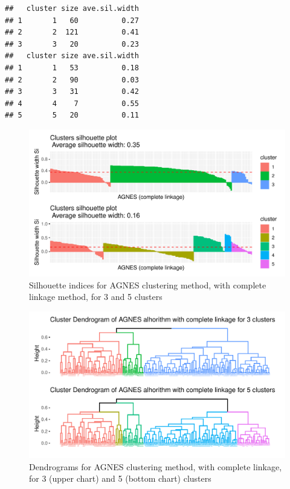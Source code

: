 \documentclass[11pt,a4paper]{article}\usepackage[]{graphicx}\usepackage[]{xcolor}
\makeatletter
\def\maxwidth{ %
  \ifdim\Gin@nat@width>\linewidth
    \linewidth
  \else
    \Gin@nat@width
  \fi
}
\newenvironment{kframe}{%
 \def\at@end@of@kframe{}%
 \ifinner\ifhmode%
  \def\at@end@of@kframe{\end{minipage}}%
  \begin{minipage}{\columnwidth}%
 \fi\fi%
 \def\FrameCommand##1{\hskip\@totalleftmargin \hskip-\fboxsep
 \colorbox{shadecolor}{##1}\hskip-\fboxsep
     \hskip-\linewidth \hskip-\@totalleftmargin \hskip\columnwidth}%
 \MakeFramed {\advance\hsize-\width
   \@totalleftmargin\z@ \linewidth\hsize
   \@setminipage}}%
 {\par\unskip\endMakeFramed%
 \at@end@of@kframe}
\newenvironment{knitrout}{}{} %
\makeatother
\begin{document}
\begin{knitrout}
\color{fgcolor}\begin{kframe}
\begin{verbatim}
##   cluster size ave.sil.width
## 1       1   60          0.27
## 2       2  121          0.41
## 3       3   20          0.23
##   cluster size ave.sil.width
## 1       1   53          0.18
## 2       2   90          0.03
## 3       3   31          0.42
## 4       4    7          0.55
## 5       5   20          0.11
\end{verbatim}
\end{kframe}\begin{figure}
\includegraphics[width=\maxwidth]{figure/silhouette_agnes35-1} \caption[Silhouette indices for AGNES clustering method, with complete linkage method, for 3 and 5 clusters]{Silhouette indices for AGNES clustering method, with complete linkage method, for 3 and 5 clusters}\label{fig:silhouette_agnes35}
\end{figure}

\end{knitrout}
	
\begin{knitrout}
\color{fgcolor}\begin{figure}
\includegraphics[width=\maxwidth]{figure/dendrograms_agnes-1} \caption[Dendrograms for AGNES clustering method, with complete linkage, for 3 (upper chart) and 5 (bottom chart) clusters]{Dendrograms for AGNES clustering method, with complete linkage, for 3 (upper chart) and 5 (bottom chart) clusters}\label{fig:dendrograms_agnes}
\end{figure}

\end{knitrout}
	
\end{document}

